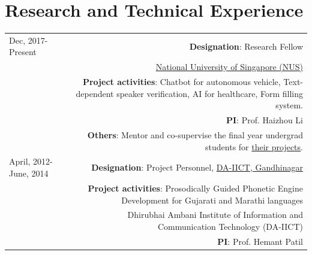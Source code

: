 \documentclass[10pt]{article}
\begin{document}
\section*{Research and Technical Experience}
\begin{tabular}{L!{\VRule}R}
	Dec, 2017-Present&\textbf{Designation}: Research Fellow \\
	& \href{http://ece.nus.edu.sg/hlt/maulik/}{National University of Singapore (NUS)}\\
	&\textbf{Project activities}:  Chatbot for autonomous vehicle, Text-dependent speaker verification, AI for healthcare, Form filling system.\\
	&\textbf{PI}: Prof. Haizhou Li \vspace{0.3cm}\\
	&\textbf{Others}: Mentor and co-supervise the final year undergrad students for \href{https://drive.google.com/drive/folders/1XS0ttBsnD0YT5Y_pZ_QEw_XN3gmKMIOT}{their projects}.
	
	\\
	April, 2012-June, 2014&\textbf{Designation}: Project Personnel, \href{https://sites.google.com/site/speechlabdaiict/projects/prosodically-guided-phonetic-engine-development}{DA-IICT, Gandhinagar} \\
	&\textbf{Project activities}: Prosodically Guided Phonetic Engine Development
	for Gujarati and Marathi languages \\
	& Dhirubhai Ambani Institute of Information and Communication Technology (DA-IICT)\\
	&\textbf{PI}: Prof. Hemant Patil\\
	
	
\end{tabular}
\end{document}
